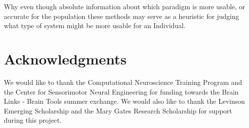 \documentclass[10pt]{article}
\begin{document}
Why even though absolute information about which paradigm is more
usable, or accurate for the population these methods may serve as a
heuristic for judging what type of system might be more usable for
an Individual.

\section{Acknowledgments}
We would like to thank the Computational Neuroscience Training Program
and the Center for Sensorimotor Neural Engineering for funding towards
the Brain Links - Brain Tools summer exchange. We would also like to
thank the Levinson Emerging Scholarship and the Mary Gates Research
Scholarship for support during this project.

\clearpage    
\begin{spacing}{.865}
\footnotesize{

}
\end{spacing}
\end{document}
